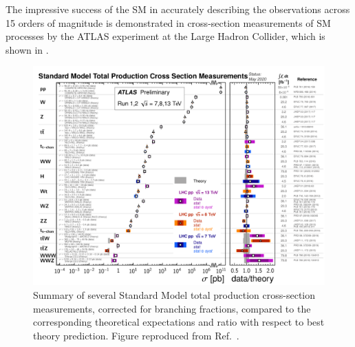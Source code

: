 The impressive success of the SM in accurately describing the observations across 15 orders of magnitude is demonstrated in cross-section measurements of SM processes by the ATLAS experiment at the Large Hadron Collider, which is shown in .

\begin{figure}[htbp]
    \centering
    \includegraphics[width=1.05\textwidth]{figures/standardmodel/sm_processes_atlas_fig_02.pdf}
    \caption{Summary of several Standard Model total production cross-section measurements, corrected for branching fractions, compared to the corresponding theoretical expectations and ratio with respect to best theory prediction. Figure reproduced from Ref.~\cite{ATL-PHYS-PUB-2020-010}.}
    \label{fig:sm:atlas-measurement}
\end{figure}

